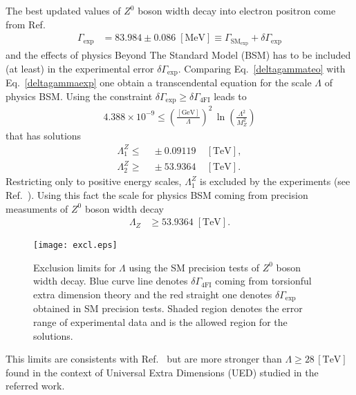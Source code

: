The best updated values of $Z^0$ boson width decay into electron positron come from Ref.~\cite{Beringer:1900zz}
\begin{align}
\label{deltagammaexp}
 \Gamma_{\text{exp}} &= 83.984 \pm 0.086\;[\text{MeV}] \equiv \Gamma_{\text{SM}_\text{exp}} + \delta\Gamma_{\text{exp}}
\end{align}
and the effects of physics Beyond The Standard Model (BSM) has to be included (at least) in the experimental error $\delta\Gamma_{\text{exp}}$. Comparing Eq.~\eqref{deltagammateo} with Eq.~\eqref{deltagammaexp} one obtain a transcendental equation for the scale $\Lambda$ of physics BSM. Using the constraint $\delta\Gamma_{\text{exp}} \geq \delta\Gamma_{\text{4FI}}$ leads to
\begin{align}
\label{trascendental}
4.388\times10^{-9}\leq\left(\frac{[\text{GeV}]}{\Lambda}\right)^2\,\ln\left(\frac{\Lambda^2}{M_Z^2}\right)
\end{align}
that has solutions
\begin{eqnarray}
 \label{lowscalefromz}
 \Lambda_1^{Z} \leq&\; \pm0.09119\;&[\text{TeV}], \\
 \label{upscalefromz}
 \Lambda_2^{Z} \geq&\; \pm53.9364\;&[\text{TeV}].
\end{eqnarray}
Restricting only to positive energy scales, $\Lambda_1^Z$ is excluded by the experiments (see Ref.~\cite{Chatrchyan:2013muj}). Using this fact the scale for physics BSM coming from precision measuments of $Z^0$ boson width decay
\begin{align}
 \Lambda_Z &\geq 53.9364\;[\text{TeV}].
\end{align}
\begin{figure}[H]
 \texttt{[image: excl.eps]}
 \caption{Exclusion limits for $\Lambda$ using the SM precision tests of $Z^0$ boson width decay. Blue curve line denotes $\delta\Gamma_{\text{4FI}}$ coming from torsionful extra dimension theory and the red straight one denotes $\delta\Gamma_{\text{exp}}$ obtained in SM precision tests. Shaded region denotes the error range of experimental data and is the allowed region for the solutions.}
\end{figure}

This limits are consistents with Ref.~\cite{Chang:2000yw} but are more stronger than $\Lambda \geq 28\,[\text{TeV}]$ found in the context of Universal Extra Dimensions (UED) studied in the referred work.


